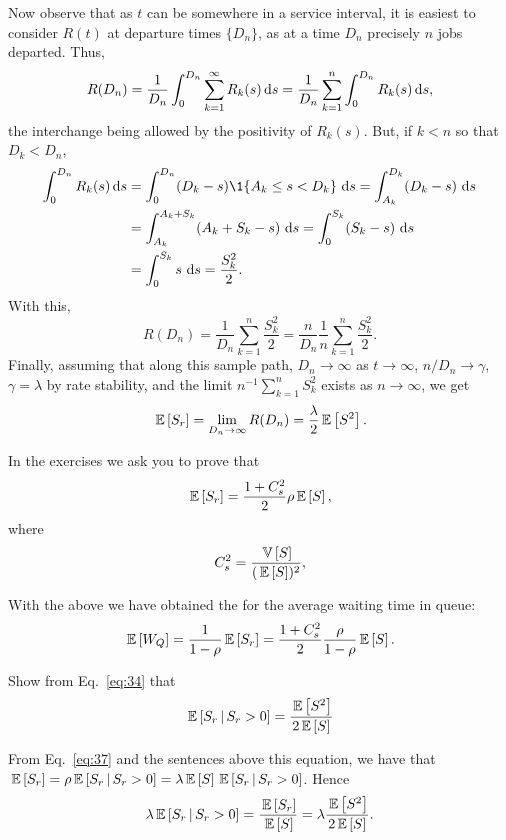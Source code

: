 Now observe that as $t$ can be somewhere in a service interval, it is
easiest to consider $R(t)$ at departure times $\{D_n\}$, as at a time
$D_n$ precisely $n$ jobs departed. Thus,
\begin{align*}
R(D_n)
= \frac{1}{D_n} \int_0^{D_n} \sum_{k=1}^\infty R_k(s) \,\text{d}s 
= \frac{1}{D_n} \sum_{k=1}^n \int_0^{D_n}  R_k(s) \,\text{d}s,
\end{align*}
the interchange being allowed by the positivity of $R_k(s)$.  But, if
$k<n$ so that $D_k< D_n$, 
\begin{align*}
\int_0^{D_n} R_k(s) \d s
&= \int_0^{D_n} (D_k-s)\1{A_k \leq s < D_k}\, \d s = \int_{A_k}^{D_k} (D_k-s) \, \d s \\
&= \int_{A_k}^{A_k+S_k} (A_k+S_k-s) \, \d s  = \int_{0}^{S_k} (S_k-s) \, \d s \\
&= \int_{0}^{S_k} s \, \d s = \frac{S_k^2}2.
\end{align*}
With this, 
\begin{equation*}
R(D_n)
= \frac{1}{D_n} \sum_{k=1}^n \frac{S_k^2}2 = \frac{n}{D_n} \frac 1 n\sum_{k=1}^n \frac{S_k^2}2.
\end{equation*}
Finally, assuming that along this sample path, $D_n\to \infty$ as
$t\to \infty$, $n/D_n \to \gamma$, $\gamma=\lambda$ by rate stability,
and the limit $n^{-1}\sum_{k=1}^n S_k^2$ exists as $n\to\infty$, we
get
\begin{equation}\label{eq:34}
\,\mathbb{E}\left[S_r\right] = \lim_{D_n\to\infty} R(D_n) = \frac{\lambda}2 \,\mathbb{E}\left[S^2\right].
\end{equation}

In the exercises we ask you to prove that
\begin{equation}\label{eq:32}
  \,\mathbb{E}\left[S_r\right] = \frac{1+C_s^2}2\rho\,\mathbb{E}\left[S\right],
\end{equation}
where
\begin{equation*}
 C_s^2 = \frac{\,\mathbb{V}\left[S\right] }{(\,\mathbb{E}\left[S\right])^2},
\end{equation*}

With the above we have obtained the  for the average waiting time in queue:
\begin{equation} \label{eq:710}
  \,\mathbb{E}\left[W_Q\right] = \frac1{1-\rho} \,\mathbb{E}\left[S_r\right] =\frac{1 + C_s^2}2 \frac{\rho}{1-\rho}  \,\mathbb{E}\left[S\right].
\end{equation}

\begin{question}\label{ex:9}
Show  from Eq.~\eqref{eq:34} that
\begin{equation*}
  \,\mathbb{E}\left[S_r\,\middle|\, S_r>0\right] = \frac{\,\mathbb{E}\left[S^2\right]}{2 \,\mathbb{E}\left[S\right]}
\end{equation*}
\begin{solution}
 From Eq.~\eqref{eq:37} and the sentences above this equation,
    we have that
    $\,\mathbb{E}\left[S_r\right] = \rho \,\mathbb{E}\left[S_r\,\middle|\, S_r>0\right]=\lambda \,\mathbb{E}\left[S\right] \,\mathbb{E}\left[S_r\,\middle|\, S_r>0\right]$. Hence
    \begin{equation*}
    \lambda \,\mathbb{E}\left[S_r\,\middle|\, S_r>0\right] = \frac{\,\mathbb{E}\left[S_r\right]}{\,\mathbb{E}\left[S\right]} = \lambda \frac{\,\mathbb{E}\left[S^2\right]}{2 \,\mathbb{E}\left[S\right]}.
    \end{equation*}
\end{solution}
\end{question}


